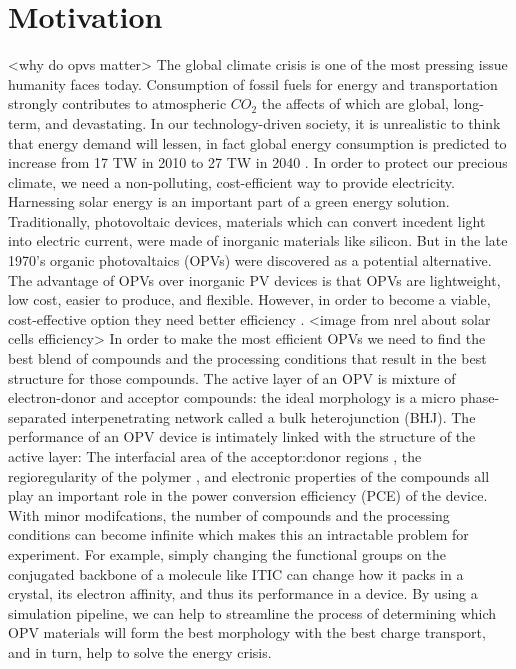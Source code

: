 \section*{Motivation}
<why do opvs matter>
The global climate crisis is one of the most pressing issue humanity faces today.
Consumption of fossil fuels for energy and transportation strongly contributes to atmospheric $CO_2$ the affects of which are global, long-term, and devastating\cite{Solomon2009a}.
In our technology-driven society, it is unrealistic to think that energy demand will lessen, in fact global energy consumption is predicted to increase from 17 TW in 2010 to 27 TW in 2040 \cite{Mazzio2015}.
In order to protect our precious climate, we need a non-polluting, cost-efficient way to provide electricity.
Harnessing solar energy is an important part of a green energy solution.
Traditionally, photovoltaic devices, materials which can convert incedent light into electric current, were made of inorganic materials like silicon.
But in the late 1970's organic photovaltaics (OPVs) were discovered as a potential alternative.
The advantage of OPVs over inorganic PV devices is that OPVs are lightweight, low cost, easier to produce, and flexible. 
However, in order to become a viable, cost-effective option they need better efficiency \cite{Mazzio2015}.
<image from nrel about solar cells efficiency>\cite{https://www.nrel.gov/pv/cell-efficiency.html}
In order to make the most efficient OPVs we need to find the best blend of compounds and the processing conditions that result in the best structure for those compounds.
The active layer of an OPV is mixture of electron-donor and acceptor compounds: the ideal morphology is a micro phase-separated interpenetrating network called a bulk heterojunction (BHJ).
The performance of an OPV device is intimately linked with the structure of the active layer:
The interfacial area of the acceptor:donor regions \cite{Mazzio2015}, the regioregularity of the polymer \cite{Kim2006}, and electronic properties of the compounds \cite{Scharber2006a} all play an important role in the power conversion efficiency (PCE) of the device.
With minor modifcations, the number of compounds and the processing conditions can become infinite which makes this an intractable problem for experiment.
For example, simply changing the functional groups on the conjugated backbone of a molecule like ITIC can change how it packs in a crystal, its electron affinity, and thus its performance in a device\cite{Swick2019a}.
By using a simulation pipeline, we can help to streamline the process of determining which OPV materials will form the best morphology with the best charge transport, and in turn, help to solve the energy crisis.
